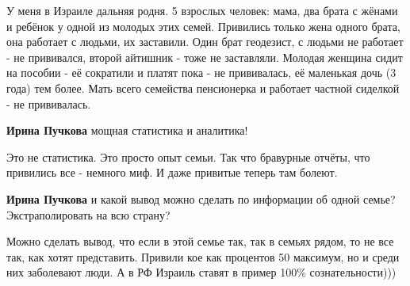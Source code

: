 \begin{itemize}
\begin{itemize}
У меня в Израиле дальняя родня. 5 взрослых человек: мама, два брата с жёнами и ребёнок у одной из молодых этих семей. Привились только жена одного брата, она работает с людьми, их заставили. Один брат геодезист, с людьми не работает - не прививался, второй айтишник - тоже не заставляли. Молодая женщина сидит на пособии - её сократили и платят пока - не прививалась, её маленькая дочь (3 года) тем более. Мать всего семейства пенсионерка и работает частной сиделкой - не прививалась.

 
\textbf{Ирина Пучкова} мощная статистика и аналитика!

 
Это не статистика. Это просто опыт семьи. Так что бравурные отчёты, что привились все - немного миф. И даже привитые теперь там болеют.

 
\textbf{Ирина Пучкова} и какой вывод можно сделать по информации об одной семье? Экстраполировать на всю страну?

 
Можно сделать вывод, что если в этой семье так, так в семьях рядом, то не все так, как хотят представить. Привили кое как процентов 50 максимум, но и среди них заболевают люди. А в РФ Израиль ставят в пример 100\% сознательности)))

 

\end{itemize}
\end{itemize}
